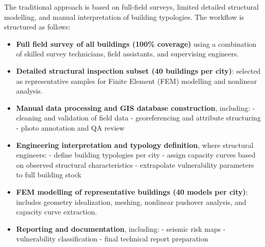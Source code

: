The traditional approach is based on full-field surveys, limited detailed structural modelling, and manual interpretation of building typologies. The workflow is structured as follows:

\begin{itemize}
    \item \textbf{Full field survey of all buildings (100\% coverage)} using a combination of skilled survey technicians, field assistants, and supervising engineers.
    
    \item \textbf{Detailed structural inspection subset (40 buildings per city)}:
    selected as representative samples for Finite Element (FEM) modelling and nonlinear analysis.

    \item \textbf{Manual data processing and GIS database construction}, including:
    - cleaning and validation of field data  
    - georeferencing and attribute structuring  
    - photo annotation and QA review  

    \item \textbf{Engineering interpretation and typology definition}, where structural engineers:
    - define building typologies per city  
    - assign capacity curves based on observed structural characteristics  
    - extrapolate vulnerability parameters to full building stock  

    \item \textbf{FEM modelling of representative buildings (40 models per city)}:
    includes geometry idealization, meshing, nonlinear pushover analysis, and capacity curve extraction.

    \item \textbf{Reporting and documentation}, including:
    - seismic risk maps  
    - vulnerability classification  
    - final technical report preparation
\end{itemize}

